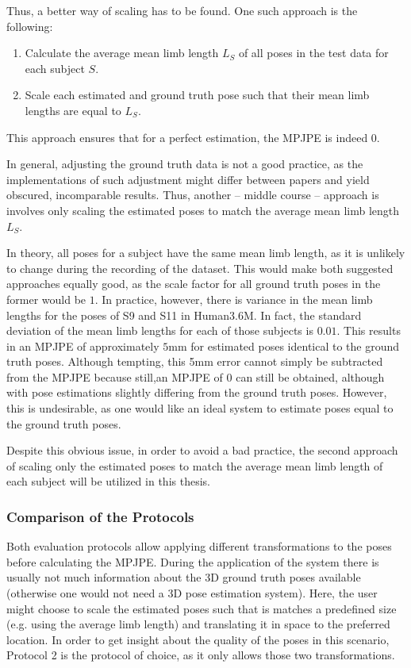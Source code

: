 Thus, a better way of scaling has to be found.
One such approach is the following:

\begin{enumerate}[label={\arabic*.}]
	\item Calculate the average mean limb length $L_S$ of all poses in the test data for each subject $S$.
	\item Scale each estimated and ground truth pose such that their mean limb lengths are equal to $L_S$.
\end{enumerate}
This approach ensures that for a perfect estimation, the MPJPE is indeed 0.

In general, adjusting the ground truth data is not a good practice, as the implementations of such adjustment might differ between papers and yield obscured, incomparable results.
Thus, another -- middle course -- approach is involves only scaling the estimated poses to match the average mean limb length $L_S$.

In theory, all poses for a subject have the same mean limb length, as it is unlikely to change during the recording of the dataset.
This would make both suggested approaches equally good, as the scale factor for all ground truth poses in the former would be $1$.
In practice, however, there is variance in the mean limb lengths for the poses of S9 and S11 in Human3.6M.
In fact, the standard deviation of the mean limb lengths for each of those subjects is $0.01$.
This results in an MPJPE of approximately $5$mm for estimated poses identical to the ground truth poses.
Although tempting, this 5mm error cannot simply be subtracted from the MPJPE because still,an MPJPE of 0 can still be obtained, although with pose estimations slightly differing from the ground truth poses.
However, this is undesirable, as one would like an ideal system to estimate poses equal to the ground truth poses.

Despite this obvious issue, in order to avoid a bad practice, the second approach of scaling only the estimated poses to match the average mean limb length of each subject will be utilized in this thesis.

\subsubsection{Comparison of the Protocols}

Both evaluation protocols allow applying different transformations to the poses before calculating the MPJPE.
During the application of the system there is usually not much information about the 3D ground truth poses available (otherwise one would not need a 3D pose estimation system).
Here, the user might choose to scale the estimated poses such that is matches a predefined size (e.g. using the average limb length) and translating it in space to the preferred location.
In order to get insight about the quality of the poses in this scenario, Protocol 2 is the protocol of choice, as it only allows those two transformations.

